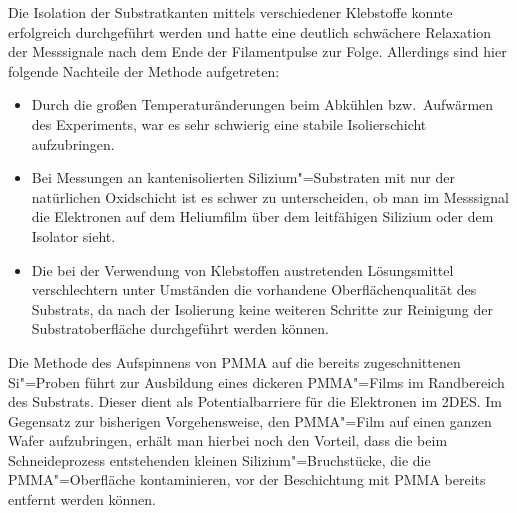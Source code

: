 Die Isolation der Substratkanten mittels verschiedener Klebstoffe konnte erfolgreich durchgeführt werden und hatte eine deutlich schwächere Relaxation der Messsignale nach dem Ende der Filamentpulse zur Folge. Allerdings sind hier folgende Nachteile der Methode aufgetreten:
\begin{itemize}
    \item Durch die großen Temperaturänderungen beim Abkühlen bzw.\ Aufwärmen des Experiments, war es sehr schwierig eine stabile Isolierschicht aufzubringen.
    \item Bei Messungen an kantenisolierten Silizium"=Substraten mit nur der natürlichen Oxidschicht ist es schwer zu unterscheiden, ob man im Messsignal die Elektronen auf dem Heliumfilm über dem leitfähigen Silizium oder dem Isolator sieht.
    \item Die bei der Verwendung von Klebstoffen austretenden Lösungsmittel verschlechtern unter Umständen die vorhandene Oberflächenqualität des Substrats, da nach der Isolierung keine weiteren Schritte zur Reinigung der Substratoberfläche durchgeführt werden können.
\end{itemize}

Die Methode des Aufspinnens von PMMA auf die bereits zugeschnittenen Si"=Proben führt zur Ausbildung eines dickeren PMMA"=Films im Randbereich des Substrats. Dieser dient als Potentialbarriere für die Elektronen im 2DES. Im Gegensatz zur bisherigen Vorgehensweise, den PMMA"=Film auf einen ganzen Wafer aufzubringen, erhält man hierbei noch den Vorteil, dass die beim Schneideprozess entstehenden kleinen Silizium"=Bruchstücke, die die PMMA"=Oberfläche kontaminieren, vor der Beschichtung mit PMMA bereits entfernt werden können.
 

